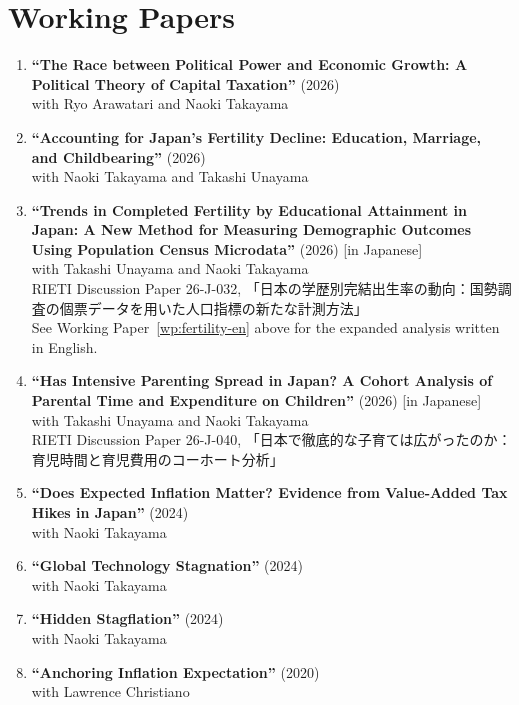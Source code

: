 \documentclass[11pt,a4paper]{article}
\newcommand{\workingpaper}[3]{
    \item \textbf{``#1''} (#2)\\
    {\small #3}
}
\begin{document}
\section{Working Papers}

\begin{enumerate}[leftmargin=*, labelsep=8pt, itemsep=6pt]
    \workingpaper{The Race between Political Power and Economic Growth: A Political Theory of Capital Taxation}{2026}
    {with Ryo Arawatari and Naoki Takayama}

    \workingpaper{Accounting for Japan's Fertility Decline: Education, Marriage, and Childbearing}{2026}
    {with Naoki Takayama and Takashi Unayama}\label{wp:fertility-en}

    \item \textbf{``Trends in Completed Fertility by Educational Attainment in Japan: A New Method for Measuring Demographic Outcomes Using Population Census Microdata''} (2026) [in Japanese]\\
    {\small with Takashi Unayama and Naoki Takayama}\\
    {\small RIETI Discussion Paper 26-J-032, 「日本の学歴別完結出生率の動向：国勢調査の個票データを用いた人口指標の新たな計測方法」}\\
    {\small See Working Paper~\ref{wp:fertility-en} above for the expanded analysis written in English.}

    \item \textbf{``Has Intensive Parenting Spread in Japan? A Cohort Analysis of Parental Time and Expenditure on Children''} (2026) [in Japanese]\\
    {\small with Takashi Unayama and Naoki Takayama}\\
    {\small RIETI Discussion Paper 26-J-040, 「日本で徹底的な子育ては広がったのか：育児時間と育児費用のコーホート分析」}

    \workingpaper{Does Expected Inflation Matter? Evidence from Value-Added Tax Hikes in Japan}{2024}
    {with Naoki Takayama}

    \workingpaper{Global Technology Stagnation}{2024}
    {with Naoki Takayama}

    \workingpaper{Hidden Stagflation}{2024}
    {with Naoki Takayama}

    \workingpaper{Anchoring Inflation Expectation}{2020}
    {with Lawrence Christiano}
\end{enumerate}
\end{document}

